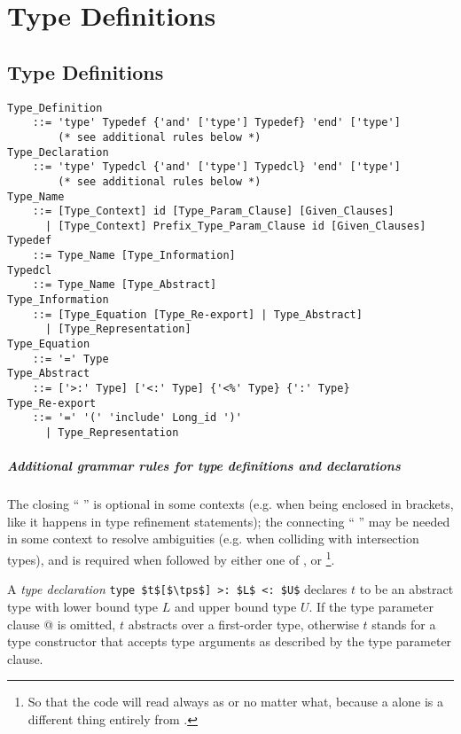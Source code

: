 
\chapter{Type Definitions}

\minitoc

\newpage

\section{Type Definitions}
\label{sec:type-decls-aliases}

\grammar\begin{lstlisting}
Type_Definition 
    ::= 'type' Typedef {'and' ['type'] Typedef} 'end' ['type']
        (* see additional rules below *)
Type_Declaration
    ::= 'type' Typedcl {'and' ['type'] Typedcl} 'end' ['type']
        (* see additional rules below *)
Type_Name
    ::= [Type_Context] id [Type_Param_Clause] [Given_Clauses]
      | [Type_Context] Prefix_Type_Param_Clause id [Given_Clauses]
Typedef 
    ::= Type_Name [Type_Information]
Typedcl
    ::= Type_Name [Type_Abstract]
Type_Information
    ::= [Type_Equation [Type_Re-export] | Type_Abstract]
      | [Type_Representation]
Type_Equation 
    ::= '=' Type
Type_Abstract 
    ::= ['>:' Type] ['<:' Type] {'<%' Type} {':' Type}
Type_Re-export
    ::= '=' '(' 'include' Long_id ')'
      | Type_Representation
\end{lstlisting}

\paragraph{Additional grammar rules for type definitions and declarations}
The closing ``\,\,'' is optional in some contexts (e.g. when being enclosed in brackets, like it happens in type refinement statements); the connecting ``\,\code{['type']}\,'' may be needed in some context to resolve ambiguities (e.g. when colliding with intersection types), and is required when followed by either one of ,  or \footnote{So that the code will read always as  or  no matter what, because a  alone is a different thing entirely from .}. 

A {\em type declaration} \lstinline!type $t$[$\tps$] >: $L$ <: $U$! declares $t$ to be an abstract type with lower bound type $L$ and upper bound type $U$. If the type parameter clause \lstinline@[$\tps$]@ is omitted, $t$ abstracts over a first-order type, otherwise $t$ stands for a type constructor that accepts type arguments as described by the type parameter clause. 

